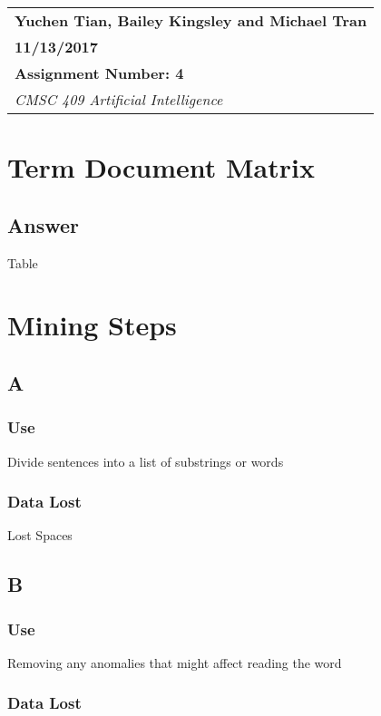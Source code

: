\documentclass{article}
\begin{document}
\null\hfill\begin{tabular}[t]{l@{}}
	\textbf{Yuchen Tian, Bailey Kingsley and Michael Tran} \\
	\textbf{11/13/2017} \\
	\textbf{Assignment Number: 4} \\
	\textit{CMSC 409 Artificial Intelligence}
\end{tabular}

\section{Term Document Matrix}

\subsection{Answer}

Table

\section{Mining Steps}

\subsection{A}

\subsubsection{Use}

Divide sentences into a list of substrings or words

\subsubsection{Data Lost}

Lost Spaces

\subsection{B}

\subsubsection{Use}

Removing any anomalies that might affect reading the word

\subsubsection{Data Lost}
\end{document}

